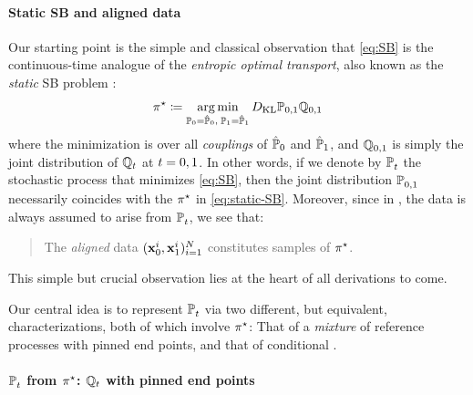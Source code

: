 \paragraph{Static SB and aligned data}

Our starting point is the simple and classical observation that \eqref{eq:SB} is the continuous-time analogue of the \emph{entropic optimal transport}, also known as the \emph{static} \acrlong{SB} problem \citep{leonard2013survey,chen2021stochastic,peyre2019computational}:
\begin{equation}
\label{eq:static-SB}
\Pssol \defeq \argmin_{ \substack{ \Pinit = \distinit, \; \Pend = \distend} } \KL{\mathbb{P}_{0,1}}{\refprobase_{0,1}}
\end{equation}where the minimization is over all \emph{couplings} of $\distinit$ and $\distend$, and $\refprobase_{0,1}$ is simply the joint distribution of $\refpro$ at $t=0,\horizon$. In other words, if we denote by $\Psol$ the stochastic process that minimizes \eqref{eq:SB}, then the joint distribution $\Psol[0,\horizon]$ necessarily coincides with the $\Pssol$ in \eqref{eq:static-SB}. Moreover, since in , the data is always assumed to arise from $\Psol$, we see that:
\begin{quote}
The \emph{aligned} data $(\x_0^i,\x_1^i)_{i=1}^N$ constitutes samples of $\Pssol$.
\end{quote}
This simple but crucial observation lies at the heart of all derivations to come. 

Our central idea is to represent $\Psol$ via two different, but equivalent, characterizations, both of which involve $\Pssol$: That of a \emph{mixture} of reference processes with pinned end points, and that of conditional .



\paragraph{$\Psol$ from $\Pssol$: $\refpro$ with pinned end points}

